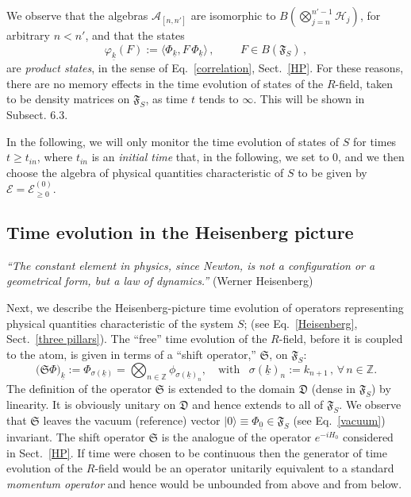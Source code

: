 \documentclass[a4paper,11pt]{article}
\begin{document}
We observe that the algebras $\mathcal{A}_{[n,n']}$ are isomorphic to $B(\bigotimes_{j=n}^{n'-1}\mathcal{H}_{j})$, for 
arbitrary  $n<n'$, and that the states
\begin{equation}\label{product states}
\varphi_{\underline{k}}(F):= \langle \Phi_{\underline{k}}, F\, \Phi_{\underline{k}} \rangle\,, \,\, \qquad F \in B(\mathfrak{F}_S)\,,
\end{equation}
are \textit{product states}, in the sense of Eq.~\eqref{correlation}, Sect.~\ref{HP}. For these reasons, there are no memory effects in the time evolution of states of the $R$-field, taken to be density matrices on $\mathfrak{F}_S$, as time $t$ tends to $\infty$. This will be shown in Subsect. 6.3.

In the following, we will only monitor the time evolution of states of $S$ for times  $t\geq t_{in}$, where $t_{in}$ 
is an \textit{initial time} that, in the following, we set to 0, and we then choose the algebra of physical quantities 
characteristic of $S$ to be given by $\mathcal{E}= \mathcal{E}_{\geq 0}^{(0)}$. 

\subsection{Time evolution in the Heisenberg picture}

\hspace{0.5cm} \textit{``The constant element in physics, since Newton, is not a configuration or a geometrical form, but a law of dynamics.''} (Werner Heisenberg)

Next, we describe the Heisenberg-picture time evolution of operators representing physical quantities characteristic 
of the system $S$; (see Eq.~\eqref{Heisenberg}, Sect.~\ref{three pillars}). The ``free'' time evolution of the $R$-field, before it is coupled to the atom, is given in terms of
a ``shift operator,'' $\mathfrak{S}$, on $\mathfrak{F}_S$:
\begin{equation}\label{shift map}
\big(\mathfrak{S}\Phi\big)_{\underline{k}}:= \Phi_{\sigma(\underline{k})} = \bigotimes_{n\in \mathbb{Z}} \phi_{\sigma(\underline{k})_{n}}, \quad \text{with  }\,\,\, \sigma(\underline{k})_n := k_{n+1}\,, \,\forall\, n\in \mathbb{Z}.
\end{equation}
The definition of the operator $\mathfrak{S}$ is extended to the domain $\mathfrak{D}$ (dense in $\mathfrak{F}_S$) by 
linearity. It is obviously unitary on $\mathfrak{D}$ and hence extends to all of $\mathfrak{F}_S$. We observe that 
$\mathfrak{S}$ leaves the vacuum (reference) vector $\vert 0 \rangle \equiv \Phi_{\underline{0}} \in \mathfrak{F}_S$ 
(see Eq.~\eqref{vacuum}) invariant. The shift operator $\mathfrak{S}$ is the analogue of the operator $e^{-iH_0}$ 
considered in Sect.~\ref{HP}. If time were chosen to be continuous then the generator of time evolution of the $R$-field 
would be an operator unitarily equivalent to a standard \textit{momentum operator} and hence would be unbounded 
from above and from below.
\end{document}
